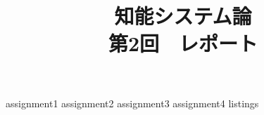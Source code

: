 \documentclass[dvipdfmx, fleqn, titlepage]{jsarticle}
\title{
	知能システム論 \\
	第2回　レポート
	}
\begin{document}
\maketitle

{assignment1}
\clearpage
{assignment2}
\clearpage
{assignment3}
\clearpage
{assignment4}
\clearpage
{listings}
\end{document}
